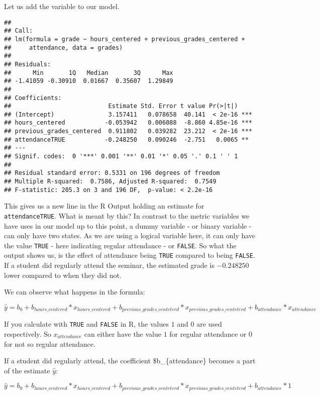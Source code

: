 \documentclass[
]{book}
\begin{document}
Let us add the variable to our model.

\begin{verbatim}
## 
## Call:
## lm(formula = grade ~ hours_centered + previous_grades_centered + 
##     attendance, data = grades)
## 
## Residuals:
##      Min       1Q   Median       3Q      Max 
## -1.41059 -0.30910  0.01667  0.35607  1.29849 
## 
## Coefficients:
##                           Estimate Std. Error t value Pr(>|t|)    
## (Intercept)               3.157411   0.078658  40.141  < 2e-16 ***
## hours_centered           -0.053942   0.006088  -8.860 4.85e-16 ***
## previous_grades_centered  0.911802   0.039282  23.212  < 2e-16 ***
## attendanceTRUE           -0.248250   0.090246  -2.751   0.0065 ** 
## ---
## Signif. codes:  0 '***' 0.001 '**' 0.01 '*' 0.05 '.' 0.1 ' ' 1
## 
## Residual standard error: 0.5331 on 196 degrees of freedom
## Multiple R-squared:  0.7586, Adjusted R-squared:  0.7549 
## F-statistic: 205.3 on 3 and 196 DF,  p-value: < 2.2e-16
\end{verbatim}

This gives us a new line in the R Output holding an estimate for
\texttt{attendanceTRUE}. What is meant by this? In contrast to the metric variables we
have uses in our model up to this point, a dummy variable - or binary variable -
can only have two states. As we are using a logical variable here, it can only
have the value \texttt{TRUE} - here indicating regular attendance - or \texttt{FALSE}. So what
the output shows us, is the effect of attendance being \texttt{TRUE} compared to being
\texttt{FALSE}. If a student did regularly attend the seminar, the estimated grade is
\(-0.248250\) lower compared to when they did not.

We can observe what happens in the formula:

\[\hat{y} = b_0 + b_{hours\_centered}*x_{hours\_centered} + b_{previous\_grades\_centeterd}*x_{previous\_grades\_centeterd} + b_{attendance} * x_{attendance}\]

If you calculate with \texttt{TRUE} and \texttt{FALSE} in R, the values \(1\) and \(0\) are used
respectively. So \(x_{attendance}\) can either have the value \(1\) for regular
attendance or \(0\) for not so regular attendance.

If a student did regularly attend, the coefficient \$b\_\{attendance\} becomes a
part of the estimate \(\hat{y}\):

\[\hat{y} = b_0 + b_{hours\_centered}*x_{hours\_centered} + b_{previous\_grades\_centeterd}*x_{previous\_grades\_centeterd} + b_{attendance} * 1\]
\end{document}
